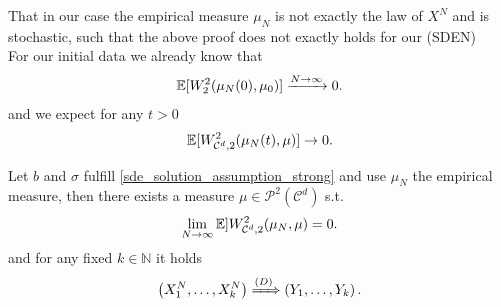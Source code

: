 \begin{remark}
 That in our case the empirical measure $\mu_N$ is not exactly the law of $X^{N} $ and is 
 stochastic, such that the above proof does not exactly holds for our (SDEN)\\
 For our initial data we already know that 
 \begin{align*}
   \mathbb{E}[W_2^2(\mu_N(0),\mu_0  )] \xrightarrow{N\to \infty} 0
 .\end{align*}
 and we expect for any $t>0$
 \begin{align*}
   \mathbb{E}[W_{\mathcal{C}^{d},2 }^2(\mu_N(t),\mu )] \to 0
 .\end{align*}
\end{remark}
\begin{theorem}
  Let $b$ and $\sigma$ fulfill \autoref{sde_solution_assumption_strong} and use 
  $\mu_N$ the empirical measure, then there exists a measure $\mu \in \mathcal{P}^2(\mathcal{C}^{d} )$ s.t. 
  \begin{align*}
    \lim_{N\to \infty}\E]W_{\mathcal{C}^{d},2 }^2(\mu_N,\mu ) = 0
  .\end{align*}
  and for any fixed $k \in  \mathbb{N}$ it holds
  \begin{align*}
    \left( X^{N}_1,\ldots ,X_k^{N}   \right)  \xRightarrow{(D)} \left( Y_{1},\ldots ,Y_{k}   \right) 
  .\end{align*}
\end{theorem}
